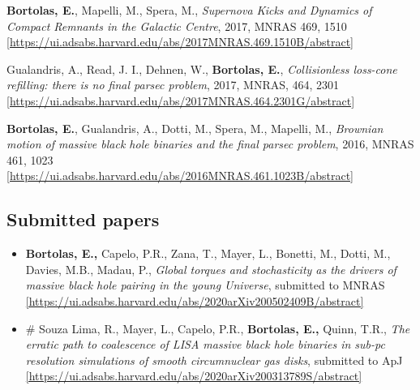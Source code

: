 \begin{etaremune}
\item {\bf Bortolas, E.}, Mapelli, M., Spera, M., {\it Supernova Kicks and Dynamics of Compact Remnants in the Galactic Centre}, 2017, MNRAS 469, 1510 \\ \href{https://ui.adsabs.harvard.edu/abs/2017MNRAS.469.1510B/abstract}{\scriptsize [https://ui.adsabs.harvard.edu/abs/2017MNRAS.469.1510B/abstract]} 

\item Gualandris, A., Read, J. I., Dehnen, W., {\bf Bortolas, E.}, {\it Collisionless loss-cone refilling: there is no final parsec problem}, 2017, MNRAS, 464, 2301 
\\ \href{https://ui.adsabs.harvard.edu/abs/2017MNRAS.464.2301G/abstract}{\scriptsize [https://ui.adsabs.harvard.edu/abs/2017MNRAS.464.2301G/abstract]}


\item {\bf Bortolas, E.}, Gualandris, A., Dotti, M., Spera, M., Mapelli, M., {\it Brownian motion of massive black hole binaries and the final parsec problem}, 2016, MNRAS 461, 1023 \\ \href{https://ui.adsabs.harvard.edu/abs/2016MNRAS.461.1023B/abstract}{\scriptsize [https://ui.adsabs.harvard.edu/abs/2016MNRAS.461.1023B/abstract]}


\end{etaremune}

\subsection*{ Submitted papers }

\begin{itemize}
\setlength\itemsep{-1pt}


\item \textbf{Bortolas, E.,}  Capelo, P.R., Zana, T., Mayer, L., Bonetti, M., Dotti, M., Davies, M.B., Madau, P.,  { \it Global torques and stochasticity as the drivers of massive black hole pairing in the young Universe}, submitted to MNRAS \\ \href{https://ui.adsabs.harvard.edu/abs/2020arXiv200502409B/abstract}{\scriptsize [https://ui.adsabs.harvard.edu/abs/2020arXiv200502409B/abstract]}

\item  \# Souza Lima, R., Mayer, L., Capelo, P.R., \textbf{Bortolas, E.,} Quinn, T.R., { \it The erratic path to coalescence of LISA massive black hole binaries in sub-pc resolution simulations of smooth circumnuclear gas disks}, submitted to ApJ \\ \href{https://ui.adsabs.harvard.edu/abs/2020arXiv200313789S/abstract}{\scriptsize [https://ui.adsabs.harvard.edu/abs/2020arXiv200313789S/abstract]}



\end{itemize}


